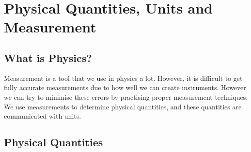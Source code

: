 \documentclass[../main.tex]{subfiles}
\begin{document}
	\section{Physical Quantities, Units and Measurement}
		\subsection*{What is Physics?}
			Measurement is a tool that we use in physics a lot. However, it is difficult to get fully accurate measurements due to how well we can create instruments. However we can try to minimise these errors by practising proper measurement techniques. We use measurements to determine physical quantities, and these quantities are communicated with units.
			
		\subsection{Physical Quantities}
\end{document}
